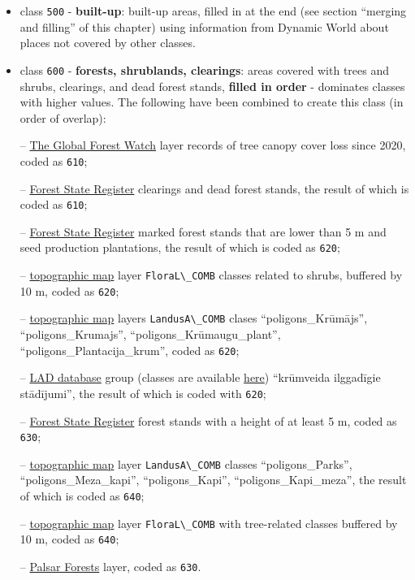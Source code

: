 \documentclass[
]{book}
\newcommand{\passthrough}[1]{#1}
\begin{document}
\begin{itemize}
\item
  class \passthrough{\lstinline!500!} - \textbf{built-up}: built-up areas, filled in at the end (see section
  ``merging and filling'' of this chapter) using information from Dynamic World about
  places not covered by other classes.
\item
  class \passthrough{\lstinline!600!} - \textbf{forests, shrublands, clearings}: areas covered with trees and
  shrubs, clearings, and dead forest stands, \textbf{filled in order} - dominates
  classes with higher values. The following have been combined to create this
  class (in order of overlap):

  -- \hyperref[Ch04.09]{The Global Forest Watch} layer records of tree canopy cover
  loss since 2020, coded as \passthrough{\lstinline!610!};

  -- \hyperref[Ch04.01]{Forest State Register} clearings and dead forest stands, the result
  of which is coded as \passthrough{\lstinline!610!};

  -- \hyperref[Ch04.01]{Forest State Register} marked forest stands that are lower than 5 m
  and seed production plantations, the result of which is coded as \passthrough{\lstinline!620!};

  -- \hyperref[Ch04.04]{topographic map} layer \passthrough{\lstinline!FloraL\_COMB!} classes related to shrubs,
  buffered by 10 m, coded as \passthrough{\lstinline!620!};

  -- \hyperref[Ch04.04]{topographic map} layers \passthrough{\lstinline!LandusA\_COMB!} clases ``poligons\_Krūmājs'',
  ``poligons\_Krumajs'', ``poligons\_Krūmaugu\_plant'', ``poligons\_Plantacija\_krum'', coded as \passthrough{\lstinline!620!};

  -- \hyperref[Ch04.02]{LAD database} group (classes are
  available \href{https://github.com/aavotins/HiQBioDiv_EGVs/blob/main/Data/Geodata/2024/LAD/KulturuKodi_2024.xlsx}{here})
  ``krūmveida ilggadīgie stādījumi'', the result of which is coded with \passthrough{\lstinline!620!};

  -- \hyperref[Ch04.01]{Forest State Register} forest stands with a height of at least 5 m,
  coded as \passthrough{\lstinline!630!};

  -- \hyperref[Ch04.04]{topographic map} layer \passthrough{\lstinline!LandusA\_COMB!} classes ``poligons\_Parks'',
  ``poligons\_Meza\_kapi'', ``poligons\_Kapi'', ``poligons\_Kapi\_meza'', the result of
  which is coded as \passthrough{\lstinline!640!};

  -- \hyperref[Ch04.04]{topographic map} layer \passthrough{\lstinline!FloraL\_COMB!} with tree-related classes
  buffered by 10 m, coded as \passthrough{\lstinline!640!};

  -- \hyperref[Ch04.10]{Palsar Forests} layer, coded as \passthrough{\lstinline!630!}.
\end{itemize}
\end{document}
